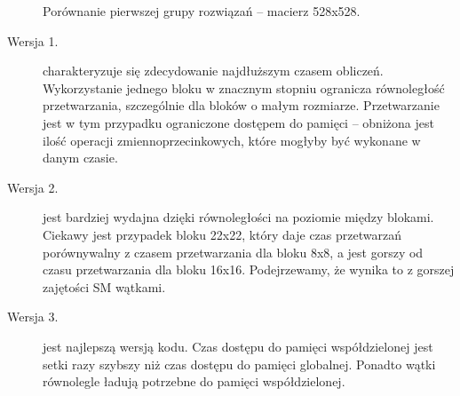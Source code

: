 \begin{figure}[H]
\begin{minipage}[c]{0.46\textwidth}
\vspace{18pt}

\end{minipage}

\caption{Porównanie pierwszej grupy rozwiązań -- macierz 528x528.}

\end{figure}

\begin{description}

\item[Wersja 1.] charakteryzuje się zdecydowanie najdłuższym czasem obliczeń. Wykorzystanie jednego bloku w znacznym stopniu ogranicza równoległość przetwarzania, szczególnie dla bloków o małym rozmiarze. Przetwarzanie jest w tym przypadku ograniczone dostępem do pamięci -- obniżona jest ilość operacji zmiennoprzecinkowych, które mogłyby być wykonane w danym czasie.

\item[Wersja 2.] jest bardziej wydajna dzięki równoległości na poziomie między blokami. Ciekawy jest przypadek bloku 22x22, który daje czas przetwarzań porównywalny z czasem przetwarzania dla bloku 8x8, a jest gorszy od czasu przetwarzania dla bloku 16x16. Podejrzewamy, że wynika to z gorszej zajętości SM wątkami.

\item[Wersja 3.] jest najlepszą wersją kodu. Czas dostępu do pamięci współdzielonej jest setki razy szybszy niż czas dostępu do pamięci globalnej. Ponadto wątki równolegle ładują potrzebne do pamięci współdzielonej.

\end{description}

